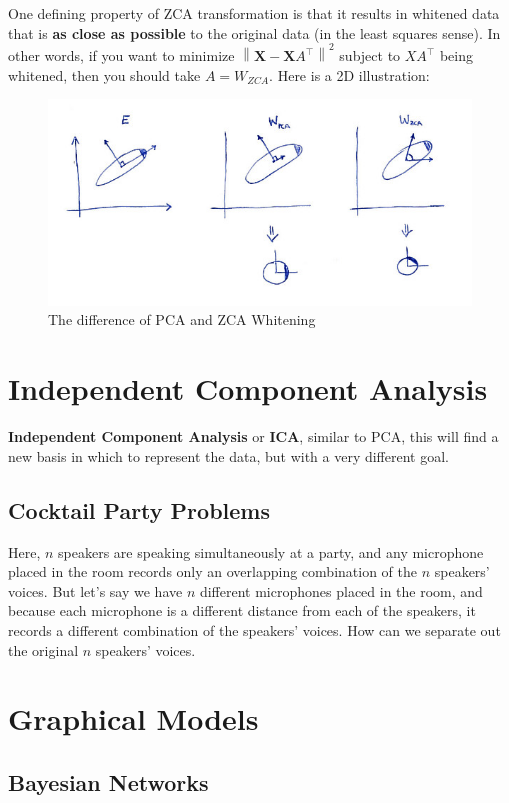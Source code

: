 \documentclass[a4paper, 12pt]{book} %
\begin{document}
One defining property of ZCA transformation is that it results in whitened data that is \textbf{as close as possible} to the original data (in the least squares sense). In other words, if you want to minimize $\left\lVert \mathbf{X}-\mathbf{X}A^\top \right\rVert^2$ subject to $XA^\top$ being whitened, then you should take $A=W_{ZCA}$. Here is a 2D illustration:

\begin{figure}[htpb]
	\centering
	\includegraphics[width=\linewidth]{figures/zca.jpg}
	\caption{The difference of PCA and ZCA Whitening}
	\label{fig:boat1}
\end{figure}


\chapter{Independent Component Analysis}
\textbf{Independent Component Analysis} or \textbf{ICA}, similar to PCA, this will find a new basis in which to represent the data, but with a very different goal.

\section{Cocktail Party Problems}
Here, $n$ speakers are speaking simultaneously at a party, and any microphone placed in the room records only an overlapping combination of the $n$ speakers' voices. But let's say we have $n$ different microphones placed in the room, and because each microphone is a different distance from each of the speakers, it records a different combination of the speakers' voices. How can we separate out the original $n$ speakers' voices.


\chapter{Graphical Models}
\section{Bayesian Networks}
\end{document}
